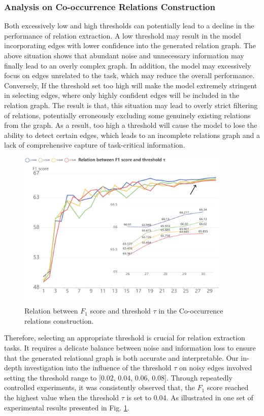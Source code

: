 \documentclass[preprint,12pt]{elsarticle}
\begin{document}
\subsubsection{Analysis on Co-occurrence Relations Construction}\label{subsubsec11}
Both excessively low and high thresholds can potentially lead to a decline in the performance of relation extraction. A low threshold may result in the model incorporating edges with lower confidence into the generated relation graph. The above situation shows that abundant noise and unnecessary information may finally lead to an overly complex graph. In addition, the model may excessively focus on edges unrelated to the task, which may reduce the overall performance. Conversely, If the threshold set too high will make the model extremely stringent in selecting edges, where only highly confident edges will be included in the relation graph. The result is that, this situation may lead to overly strict filtering of relations, potentially erroneously excluding some genuinely existing relations from the graph. As a result, too high a threshold will cause the model to lose the ability to detect certain edges, which leads to an incomplete relations graph and a lack of comprehensive capture of task-critical information.
\begin{figure}[htbp]
\centering
\includegraphics[width=4in]{./threshold.png}
\caption{Relation between $F_1$ score and threshold $\tau$ in the Co-occurrence relations construction.}
\label{fig.6}
\end{figure}

Therefore, selecting an appropriate threshold is crucial for relation extraction tasks. It requires a delicate balance between noise and information loss to ensure that the generated relational graph is both accurate and interpretable. Our in-depth investigation into the influence of the threshold $\tau$ on noisy edges involved setting the threshold range to [0.02, 0.04, 0.06, 0.08]. Through repeatedly controlled experiments, it was consistently observed that, the $F_1$ score reached the highest value when the threshold $\tau$ is set to 0.04. As illustrated in one set of experimental results presented in Fig. \ref{fig.6}.
\end{document}
